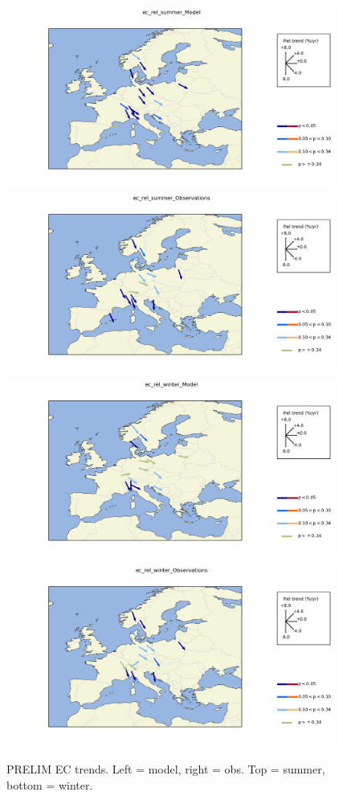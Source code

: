 \begin{figure}
\includegraphics*[height=6cm,trim=1cm 0 0 0]{FIGS_TRENDS/Plot_ec_rel_summer_Model.png}%
\includegraphics*[height=6cm,trim=2cm 0 2cm 0]{FIGS_TRENDS/Plot_ec_rel_summer_Observations.png}
\\
\includegraphics*[height=6cm,trim=1cm 0 0 0]{FIGS_TRENDS/Plot_ec_rel_winter_Model.png}%
\includegraphics*[height=6cm,trim=2cm 0 2.5cm 0]{FIGS_TRENDS/Plot_ec_rel_winter_Observations.png}
\caption{PRELIM EC trends. Left = model, right = obs. Top = summer, bottom = winter.
  \label{fig:ECarrows}}
\end{figure}

